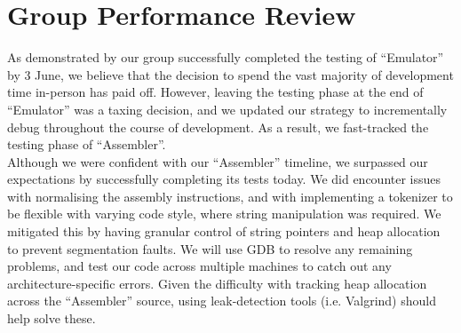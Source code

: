 \documentclass[11pt]{article}
\begin{document}
\section{Group Performance Review}
As demonstrated by our group successfully completed the testing of “Emulator” by 3 June, we believe that the decision to spend the vast majority of development time in-person has paid off. However, leaving the testing phase at the end of “Emulator” was a taxing decision, and we updated our strategy to incrementally debug throughout the course of development. As a result, we fast-tracked the testing phase of “Assembler”.
\\

Although we were confident with our “Assembler” timeline, we surpassed our expectations by successfully completing its tests today. We did encounter issues with normalising the assembly instructions, and with implementing a tokenizer to be flexible with varying code style, where string manipulation was required. We mitigated this by having granular control of string pointers and heap allocation to prevent segmentation faults. We will use GDB to resolve any remaining problems, and test our code across multiple machines to catch out any architecture-specific errors. Given the difficulty with tracking heap allocation across the “Assembler” source, using leak-detection tools (i.e. Valgrind) should help solve these.
\end{document}
